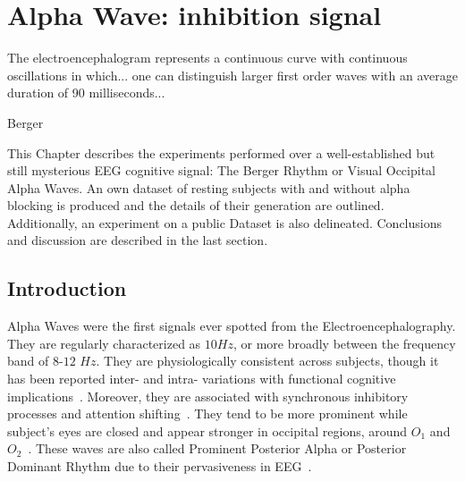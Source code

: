 \chapter{Alpha Wave: inhibition signal}
\label{chapter:four}
\epigraph{The electroencephalogram represents a continuous curve with continuous oscillations in which... one can distinguish larger first order waves with an average duration of 90 milliseconds...}{Berger}

This Chapter describes the experiments performed over a well-established but still mysterious EEG cognitive signal: The Berger Rhythm or Visual Occipital Alpha Waves.  An own dataset of resting subjects with and without alpha blocking is produced and the details of their generation are outlined.  Additionally, an experiment on a public Dataset is also delineated.  Conclusions and discussion are described in the last section.

\section{Introduction}


Alpha Waves were the first signals ever spotted from the Electroencephalography.  They are regularly characterized as $10\si{Hz}$, or more broadly between the frequency band of $8$-$12$ $\si{Hz}$. They are physiologically consistent across subjects, though it has been reported inter- and intra- variations with functional cognitive implications~\cite{Haegens2014}.   Moreover, they are associated with synchronous inhibitory processes and attention shifting~\cite{c3}. They tend to be more prominent while subject's eyes are closed and appear stronger in occipital regions, around $O_1$ and $O_2$~\cite{c6,c11}. These waves are also called Prominent Posterior Alpha or Posterior Dominant Rhythm due to their pervasiveness in EEG~\cite{Schomer2010,Haegens2014}.


